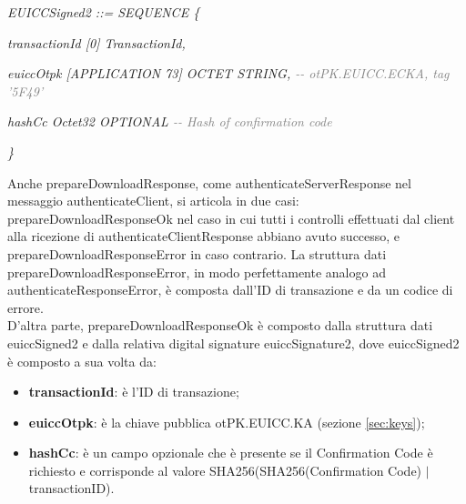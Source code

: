 \documentclass[10pt, oneside]{book}
\begin{document}
\textit{EUICCSigned2 ::= SEQUENCE \{}

\hspace{0.75cm} \textit{transactionId [0] TransactionId,}

\hspace{0.75cm} \textit{euiccOtpk [APPLICATION 73] OCTET STRING, \textcolor{gray}{{-}{-} otPK.EUICC.ECKA, tag '5F49'}}

\hspace{0.75cm} \textit{hashCc Octet32 OPTIONAL \textcolor{gray}{{-}{-} Hash of confirmation code}}

\textit{\}\\}

Anche prepareDownloadResponse, come authenticateServerResponse nel messaggio authenticateClient, si articola in due casi: prepareDownloadResponseOk nel caso in cui tutti i controlli effettuati dal client alla ricezione di authenticateClientResponse abbiano avuto successo, e prepareDownloadResponseError in caso contrario. La struttura dati prepareDownloadResponseError, in modo perfettamente analogo ad authenticateResponseError, è composta dall'ID di transazione e da un codice di errore.\\
D'altra parte, prepareDownloadResponseOk è composto dalla struttura dati euiccSigned2 e dalla relativa digital signature euiccSignature2, dove euiccSigned2 è composto a sua volta da:
\begin{itemize}
\item \textbf{transactionId}: è l'ID di transazione;
\item \textbf{euiccOtpk}: è la chiave pubblica otPK.EUICC.KA (sezione \ref{sec:keys});
\item \textbf{hashCc}: è un campo opzionale che è presente se il Confirmation Code è richiesto e corrisponde al valore SHA256(SHA256(Confirmation Code) $\vert$ transactionID).
\end{itemize}
\end{document}
